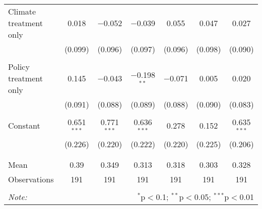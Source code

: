\begin{tabular}{@{\extracolsep{5pt}}lcccccc}
 Climate treatment only & 0.018 & $-$0.052 & $-$0.039 & 0.055 & 0.047 & 0.027 \\ 
  & (0.099) & (0.096) & (0.097) & (0.096) & (0.098) & (0.090) \\ 
  & & & & & & \\ 
 Policy treatment only & 0.145 & $-$0.043 & $-$0.198$^{**}$ & $-$0.071 & 0.005 & 0.020 \\ 
  & (0.091) & (0.088) & (0.089) & (0.088) & (0.090) & (0.083) \\ 
  & & & & & & \\ 
 Constant & 0.651$^{***}$ & 0.771$^{***}$ & 0.636$^{***}$ & 0.278 & 0.152 & 0.635$^{***}$ \\ 
  & (0.226) & (0.220) & (0.222) & (0.220) & (0.225) & (0.206) \\ 
  & & & & & & \\ 
\hline \\[-1.8ex] 
Mean & 0.39 & 0.349 & 0.313 & 0.318 & 0.303 & 0.328 \\ 
Observations & 191 & 191 & 191 & 191 & 191 & 191 \\ 
\hline 
\hline \\[-1.8ex] 
\textit{Note:}  & \multicolumn{6}{r}{$^{*}$p$<$0.1; $^{**}$p$<$0.05; $^{***}$p$<$0.01} \\ 
\end{tabular} 
